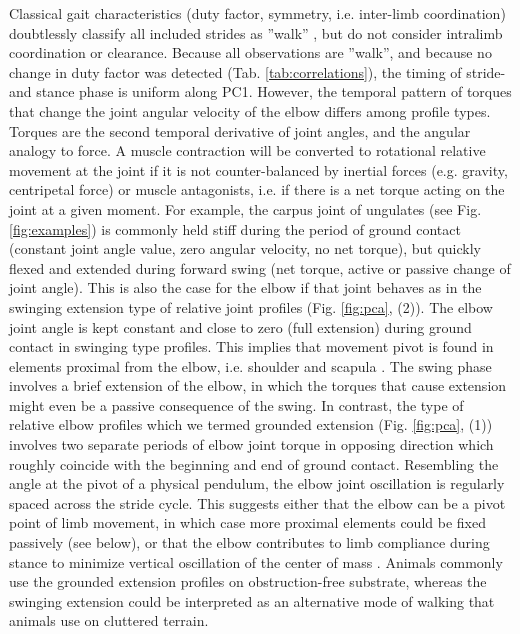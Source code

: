 \documentclass[10pt, a4paper]{article}
\begin{document}
Classical gait characteristics (duty factor, symmetry, i.e. inter-limb coordination) doubtlessly classify all included strides as ''walk'' \citep{Hildebrand1989}, but do not consider intralimb coordination or clearance. 
Because all observations are ''walk'', and because no change in duty factor was detected (Tab. \ref{tab:correlations}), the timing of stride- and stance phase is uniform along PC1. 
However, the temporal pattern of torques that change the joint angular velocity of the elbow differs among profile types. 
Torques are the second temporal derivative of joint angles, and the angular analogy to force. 
A muscle contraction will be converted to rotational relative movement at the joint if it is not counter-balanced by inertial forces (e.g. gravity, centripetal force) or muscle antagonists, i.e. if there is a net torque acting on the joint at a given moment. 
For example, the carpus joint of ungulates (see Fig. \ref{fig:examples}) is commonly held stiff during the period of ground contact (constant joint angle value, zero angular velocity, no net torque), but quickly flexed and extended during forward swing (net torque, active or passive change of joint angle).
This is also the case for the elbow if that joint behaves as in the swinging extension type of relative joint profiles (Fig. \ref{fig:pca}, (2)). 
The elbow joint angle is kept constant and close to zero (full extension) during ground contact in swinging type profiles. 
This implies that movement pivot is found in elements proximal from the elbow, i.e. shoulder and scapula \citep[][]{Fischer2002}. 
The swing phase involves a brief extension of the elbow, in which the torques that cause extension might even be a passive consequence of the swing. 
In contrast, the type of relative elbow profiles which we termed grounded extension (Fig. \ref{fig:pca}, (1)) involves two separate periods of elbow joint torque in opposing direction which roughly coincide with the beginning and end of ground contact. 
Resembling the angle at the pivot of a physical pendulum, the elbow joint oscillation is regularly spaced across the stride cycle. 
This suggests either that the elbow can be a pivot point of limb movement, in which case more proximal elements could be fixed passively (see below), or that the elbow contributes to limb compliance during stance to minimize vertical oscillation of the center of mass \citep[\textit{cf.}][]{Geyer2006}. 
Animals commonly use the grounded extension profiles on obstruction-free substrate, whereas the swinging extension could be interpreted as an alternative mode of walking that animals use on cluttered terrain. 
\end{document}
